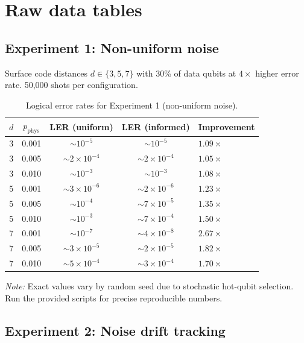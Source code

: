 \documentclass[12pt]{article}
\begin{document}
\section{Raw data tables}
\label{sec:raw_data}

\subsection{Experiment 1: Non-uniform noise}

Surface code distances $d \in \{3, 5, 7\}$ with 30\% of data qubits at $4\times$ higher error rate. 50,000 shots per configuration.

\begin{table}[h]
\centering
\caption{Logical error rates for Experiment 1 (non-uniform noise).}
\begin{tabular}{ccccl}
\toprule
$d$ & $p_{\text{phys}}$ & LER (uniform) & LER (informed) & Improvement \\
\midrule
3 & 0.001 & $\sim 10^{-5}$ & $\sim 10^{-5}$ & $1.09\times$ \\
3 & 0.005 & $\sim 2 \times 10^{-4}$ & $\sim 2 \times 10^{-4}$ & $1.05\times$ \\
3 & 0.010 & $\sim 10^{-3}$ & $\sim 10^{-3}$ & $1.08\times$ \\
5 & 0.001 & $\sim 3 \times 10^{-6}$ & $\sim 2 \times 10^{-6}$ & $1.23\times$ \\
5 & 0.005 & $\sim 10^{-4}$ & $\sim 7 \times 10^{-5}$ & $1.35\times$ \\
5 & 0.010 & $\sim 10^{-3}$ & $\sim 7 \times 10^{-4}$ & $1.50\times$ \\
7 & 0.001 & $\sim 10^{-7}$ & $\sim 4 \times 10^{-8}$ & $2.67\times$ \\
7 & 0.005 & $\sim 3 \times 10^{-5}$ & $\sim 2 \times 10^{-5}$ & $1.82\times$ \\
7 & 0.010 & $\sim 5 \times 10^{-4}$ & $\sim 3 \times 10^{-4}$ & $1.70\times$ \\
\bottomrule
\end{tabular}
\end{table}

\emph{Note:} Exact values vary by random seed due to stochastic hot-qubit selection. Run the provided scripts for precise reproducible numbers.

\subsection{Experiment 2: Noise drift tracking}
\end{document}
